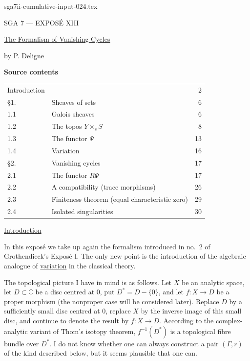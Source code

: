 \begin{filecontents*}{sga7ii-cumulative-input-024.tex}
\clearpage
\begin{center}
{\large SGA 7 --- EXPOS\'E XIII}\par
\vspace{2em}
{\Large\underline{The Formalism of Vanishing Cycles}}\par
\vspace{1.5em}
{\large by P. Deligne}
\end{center}

\medskip
\noindent\textbf{Source contents}
\begin{center}
\begin{tabular}{@{}llr@{}}
Introduction && 2\\
\S1. & Sheaves of sets & 6\\
1.1 & Galois sheaves & 6\\
1.2 & The topos $Y\times_s S$ & 8\\
1.3 & The functor $\Psi$ & 13\\
1.4 & Variation & 16\\
\S2. & Vanishing cycles & 17\\
2.1 & The functor $R\Psi$ & 17\\
2.2 & A compatibility (trace morphisms) & 26\\
2.3 & Finiteness theorem (equal characteristic zero) & 29\\
2.4 & Isolated singularities & 30
\end{tabular}
\end{center}


\medskip
\underline{Introduction}

In this expos\'e we take up again the formalism introduced in no.~2 of
Grothendieck's Expos\'e I.  The only new point is the introduction of the
algebraic analogue of \underline{variation} in the classical theory.

The topological picture I have in mind is as follows.  Let $X$ be an
analytic space, let $D\subset\mathbb C$ be a disc centred at $0$, put
$D^*=D-\{0\}$, and let $f:X\longrightarrow D$ be a proper morphism (the
nonproper case will be considered later).  Replace $D$ by a sufficiently
small disc centred at $0$, replace $X$ by the inverse image of this small
disc, and continue to denote the result by $f:X\longrightarrow D$.
According to the complex-analytic variant of Thom's isotopy theorem,
$f^{-1}(D^*)$ is a topological fibre bundle over $D^*$.  I do not know
whether one can always construct a pair $(\Gamma,r)$ of the kind
described below, but it seems plausible that one can.


\end{filecontents*}
